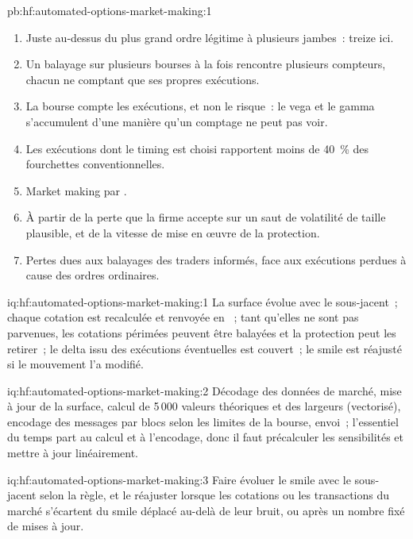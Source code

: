 \begin{solution}{pb:hf:automated-options-market-making:1}
\begin{enumerate}
treize n'en perd que trois.
\item Juste au-dessus du plus grand ordre légitime à plusieurs jambes~: treize ici.
\item Un balayage sur plusieurs bourses à la fois rencontre plusieurs compteurs, chacun ne comptant que ses propres exécutions.
\item La bourse compte les exécutions, et non le risque~: le vega et le gamma s'accumulent d'une manière qu'un comptage ne peut pas voir.
\item Les exécutions dont le timing est choisi rapportent moins de 40~\% des fourchettes conventionnelles.
\item Market making par .
\item À partir de la perte que la firme accepte sur un saut de volatilité de taille plausible, et de la vitesse de mise en œuvre de la protection.
\item Pertes dues aux balayages des traders informés, face aux exécutions perdues à cause des ordres ordinaires.
\end{enumerate}
\end{solution}

\begin{solution}{iq:hf:automated-options-market-making:1}
La surface évolue avec le sous-jacent~; chaque cotation est recalculée et renvoyée en ~; tant qu'elles ne sont pas parvenues, les cotations périmées peuvent être balayées et la
protection peut les retirer~; le delta issu des exécutions éventuelles est couvert~; le smile est réajusté si le mouvement l'a modifié.
\end{solution}

\begin{solution}{iq:hf:automated-options-market-making:2}
Décodage des données de marché, mise à jour de la surface, calcul de 5\,000 valeurs théoriques et des largeurs (vectorisé), encodage des messages par blocs selon les limites de la bourse, envoi~; l'essentiel du temps
part au calcul et à l'encodage, donc il faut précalculer les sensibilités et mettre à jour linéairement.
\end{solution}

\begin{solution}{iq:hf:automated-options-market-making:3}
Faire évoluer le smile avec le sous-jacent selon la règle, et le réajuster lorsque les cotations ou les transactions du marché s'écartent du smile déplacé au-delà de leur bruit, ou
après un nombre fixé de mises à jour.
\end{solution}

